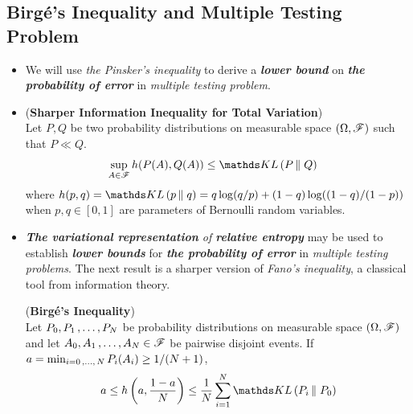 \documentclass[11pt]{article}
\begin{document}
\subsection{Birg{\'e}'s Inequality and Multiple Testing Problem}
\begin{itemize}
\item \begin{remark}
We will use \emph{the Pinsker's inequality} to derive a \emph{\textbf{lower bound}} on \emph{\textbf{the probability of error}} in \emph{multiple testing problem}.
\end{remark}

\item \begin{proposition} (\textbf{Sharper Information Inequality for Total Variation}) \citep{boucheron2013concentration}\\
Let $P, Q$ be two probability distributions on measurable space $(\Omega, {\mathscr F})$ such that $P \ll Q$.
\begin{align}
\sup_{A \in \srF} h(P(A), Q(A)) &\le \kl{P}{Q} \label{ineqn: total_variation_inequality_duality}
\end{align} where $h(p, q) = \kl{p}{q} = q\log(q/p) + (1-q)\log((1-q)/(1-p))$ when $p,q \in [0, 1]$ are parameters of Bernoulli random variables. 
\end{proposition}


\item \begin{remark}
\emph{\textbf{The variational representation} of \textbf{relative entropy}} may be used to establish \emph{\textbf{lower bounds}} for \emph{\textbf{the probability of error}} in \emph{multiple testing problems}. The next result is a sharper version of \emph{Fano's inequality}, a classical tool from information theory.
\end{remark}

\begin{proposition} (\textbf{Birg{\'e}'s Inequality})  \citep{boucheron2013concentration}\\
Let $P_0, P_1 \,{,}\ldots{,}\, P_N$ be probability distributions on measurable space $(\Omega, {\mathscr F})$  and let $A_0, A_1 \,{,}\ldots{,}\, A_N \in {\mathscr F}$ be pairwise disjoint events. If $a = \min_{i=0 \,{,}\ldots{,}\, N}P_{i}(A_i) \ge 1/(N+1)$,
\begin{align}
a \le h\paren{a, \frac{1 - a}{N}} \le \frac{1}{N}\sum_{i=1}^{N}\kl{P_i}{P_0} \label{ineqn: birge_inequality}
\end{align}
\end{proposition}


\end{itemize}

\newpage


\end{document}
